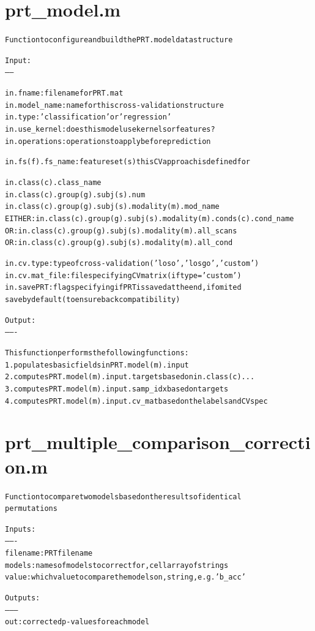 \section{prt\_model.m}
\begin{alltt}

 Function to configure and build the PRT.model data structure
 
 Input:
 ------
 
   in.fname:      filename for PRT.mat
   in.model\_name: name for this cross-validation structure
   in.type:       'classification' or 'regression'
   in.use\_kernel: does this model use kernels or features?
   in.operations: operations to apply before prediction
 
   in.fs(f).fs\_name:     feature set(s) this CV approach is defined for
 
   in.class(c).class\_name
   in.class(c).group(g).subj(s).num
   in.class(c).group(g).subj(s).modality(m).mod\_name
   EITHER: in.class(c).group(g).subj(s).modality(m).conds(c).cond\_name
   OR:     in.class(c).group(g).subj(s).modality(m).all\_scans
   OR:     in.class(c).group(g).subj(s).modality(m).all\_cond
 
   in.cv.type:     type of cross-validation ('loso','losgo','custom')
   in.cv.mat\_file: file specifying CV matrix (if type='custom')
   in.savePRT:     flag specifying if PRT is saved at the end, if omited 
                   save by default (to ensure back compatibility)
 
 Output:
 -------
 
   This function performs the following functions:
      1. populates basic fields in PRT.model(m).input
      2. computes PRT.model(m).input.targets based on in.class(c)...
      3. computes PRT.model(m).input.samp\_idx based on targets
      4. computes PRT.model(m).input.cv\_mat based on the labels and CV spec
\end{alltt}


\section{prt\_multiple\_comparison\_correction.m}
\begin{alltt}

 Function to compare two models based on the results of identical
 permutations
 
 Inputs:
 -------
 filename: PRT file name
 models  : names of models to correct for, cell array of strings
 value   : which value to compare the models on, string, e.g. 'b\_acc'
 
 Outputs:
 --------
 out: corrected p-values for each model
\end{alltt}


